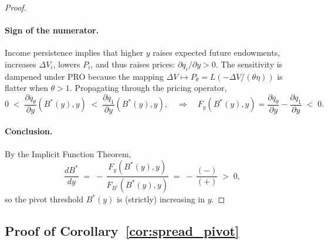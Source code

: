 \documentclass[12pt]{article}
\theoremstyle{plain}
\begin{document}
\begin{proof}
	\paragraph{Sign of the numerator.}
	Income persistence implies that higher \(y\) raises expected future endowments,
	increases \(\Delta V_i\), lowers \(P_i\), and thus raises prices: \(\partial
	q_i/\partial y>0\). The sensitivity is dampened under PRO because the mapping
	\(\Delta V \mapsto P_\theta=L(-\Delta V/(\theta\eta))\) is flatter when
	\(\theta>1\). Propagating through the pricing operator,
	\begin{equation}
		0 \;<\; \frac{\partial q_\theta}{\partial y}(B^*(y),y) \;<\; \frac{\partial q_1}{\partial y}(B^*(y),y),
		\quad\Rightarrow\quad
		F_y(B^*(y),y)=\frac{\partial q_\theta}{\partial y}-\frac{\partial q_1}{\partial y}\;<\;0.
		\label{eq:income_derivative_sign_correct}
	\end{equation}

	\paragraph{Conclusion.}
	By the Implicit Function Theorem,
	\[
		\frac{dB^*}{dy} \;=\; -\,\frac{F_y(B^*(y),y)}{F_{B'}(B^*(y),y)}
		\;=\; -\,\frac{(-)}{(+)} \;>\; 0,
	\]
	so the pivot threshold \(B^*(y)\) is (strictly) increasing in \(y\).
\end{proof}

\subsection{Proof of Corollary~\ref{cor:spread_pivot}}\label{app:proof_spread_pivot}
\end{document}
